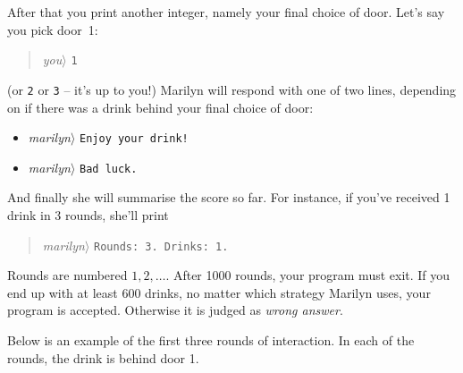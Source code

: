 After that you print another integer, namely your final choice of door.
Let's say you pick door~1:
\begin{quote}\emph{you}$\rangle$ \verb|1|\end{quote}
  (or \verb|2| or \verb|3| -- it's up to you!)
Marilyn will respond with one of two lines, depending on if there was a drink behind your final choice of door:
\begin{itemize}
\item \emph{marilyn}$\rangle$ \verb|Enjoy your drink!|
\item \emph{marilyn}$\rangle$ \verb!Bad luck.!
\end{itemize}
And finally she will summarise the score so far.
For instance, if you’ve received 1 drink in 3 rounds, she’ll print
\begin{quote}\emph{marilyn}$\rangle$ \verb!Rounds: 3. Drinks: 1.!\end{quote}
Rounds are numbered $1, 2, \ldots$.
After 1000 rounds, your program must exit. 
If you end up with at least 600 drinks, no matter which strategy Marilyn uses, your program is accepted.
Otherwise it is judged as \emph{wrong answer}.


\medskip
Below is an example of the first three rounds of interaction.
In each of the rounds, the drink is behind door 1.
